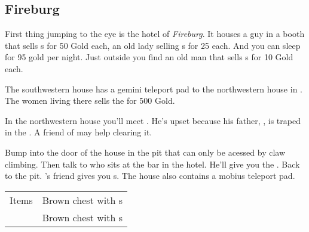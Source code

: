 \subsection{Fireburg}
\label{map:fireburg}

First thing jumping to the eye is the hotel of \textit{Fireburg}. It houses a guy in a booth that sells s for 50 Gold each, an old lady selling s for 25 each. And you can sleep for 95 gold per night. Just outside you find an old man
that sells s for 10 Gold each.

The southwestern house has a gemini teleport pad to the northwestern house in . The women living there sells the  for 500 Gold.

In the northwestern house you'll meet . He's upset because his father, , is traped in the . A friend of  may help clearing it.

Bump into the door of the house in the pit that can only be acessed by claw climbing. Then talk to  who sits at the bar in the hotel. He'll give you the . Back to the pit. 's friend gives you s. The house also contains a mobius teleport pad.

\noindent\begin{tabularx}{\textwidth}[l]{lX}
	Items
	& Brown chest with \nameref{item:refresher}s \\
	& Brown chest with \nameref{item:heal_potion}s
\end{tabularx}
